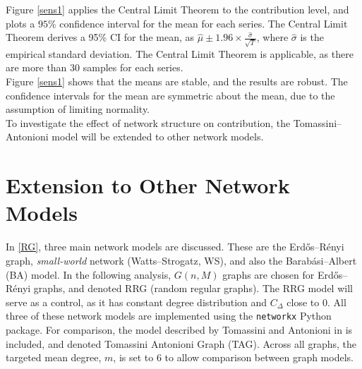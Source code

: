 Figure \ref{sens1} applies the Central Limit Theorem to the contribution level, and plots a $95\%$ confidence interval for the mean for each series. The Central Limit Theorem derives a 95\% CI for the mean, as $\hat{\mu} \pm 1.96\times\frac{\hat{\sigma}}{\sqrt{T}}$, where $\hat{\sigma}$ is the empirical standard deviation. The Central Limit Theorem is applicable, as there are more than 30 samples for each series. \\
\FloatBarrier
{}
\FloatBarrier
Figure \ref{sens1} shows that the means are stable, and the results are robust. The confidence intervals for the mean are symmetric about the mean, due to the assumption of limiting normality. \\

To investigate the effect of network structure on contribution, the Tomassini--Antonioni model will be extended to other network models.

\section{Extension to Other Network Models} \label{other_networks}

In \ref{RG}, three main network models are discussed. These are the Erd\H{o}s--R\'enyi graph, \emph{small-world} network (Watts--Strogatz, WS), and also the Barab\'{a}si--Albert (BA) model. In the following analysis, $G(n,M)$ graphs are chosen for Erd\H{o}s--R\'enyi graphs, and denoted RRG (random regular graphs). The RRG model will serve as a control, as it has constant degree distribution and $C_\Delta$ close to 0. All three of these network models are implemented using the \verb+networkx+ Python package. For comparison, the model described by Tomassini and Antonioni in \cite{RN51} is included, and denoted Tomassini Antonioni Graph (TAG). Across all graphs, the targeted mean degree, $m$, is set to 6 to allow comparison between graph models. \\

